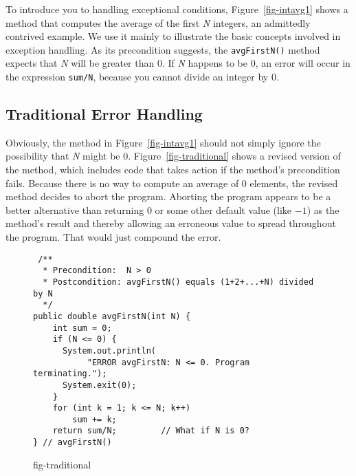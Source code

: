 \noindent To introduce you to handling exceptional conditions,
Figure~\ref{fig-intavg1} shows a method that computes the average of
the first {\it N} integers, an admittedly contrived example.  We use
it mainly to illustrate the basic concepts involved in exception
handling. As its precondition suggests, the {\tt avgFirstN()} method
expects that {\it N} will be greater than 0.  If {\it N} happens to be
0, an error will occur in the expression {\tt sum/N}, because you
cannot divide an integer by 0.

\subsection{Traditional Error Handling}
\noindent Obviously, the method in Figure~\ref{fig-intavg1} should not
simply ignore the possibility that {\it N}
might be 0. Figure~\ref{fig-traditional} shows a revised version of
the method, which includes code that takes action if the method's
precondition fails.  Because there is no way to compute an average of
0 elements, the revised method decides to abort the program.  Aborting
the program appears to be a better alternative than returning 0 or
some other default value (like $-1$) as the method's result and
thereby allowing an erroneous value to spread throughout the
program.  That would just compound the error.



\begin{figure}[tb]
\jjjprogstart
\begin{jjjlisting}[28pc]
\begin{lstlisting}
 /**
  * Precondition:  N > 0
  * Postcondition: avgFirstN() equals (1+2+...+N) divided by N
  */
public double avgFirstN(int N) {
    int sum = 0;
    if (N <= 0) {
      System.out.println(
           "ERROR avgFirstN: N <= 0. Program terminating.");
      System.exit(0);
    }
    for (int k = 1; k <= N; k++)
        sum += k;
    return sum/N;         // What if N is 0?
} // avgFirstN()
\end{lstlisting}
\end{jjjlisting}
{fig-traditional}
\end{figure}

